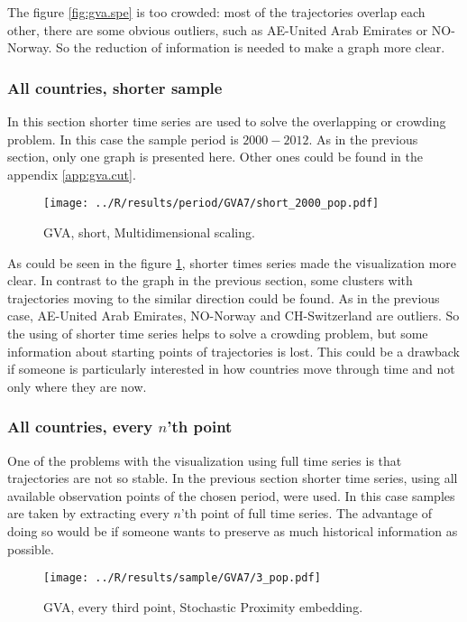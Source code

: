 \documentclass[a4paper]{article}
\begin{document}
The figure \ref{fig:gva.spe} is too crowded: most of the trajectories overlap each other, there are some obvious outliers, such as AE-United Arab Emirates or NO-Norway. So the reduction of information is needed to make a graph more clear.

\subsubsection{All countries, shorter sample}
In this section shorter time series are used to solve the overlapping or crowding problem. In this case the sample period is $2000-2012$. As in the previous section, only one graph is presented here. Other ones could be found in the appendix \ref{app:gva.cut}. 

\begin{figure}[!htbp]
\begin{center}
\texttt{[image: ../R/results/period/GVA7/short\_2000\_pop.pdf]}
\caption{GVA, short, Multidimensional scaling.}
\label{fig:gva.cut.mds}
\end{center}
\end{figure}

As could be seen in the figure \ref{fig:gva.cut.mds}, shorter times series made the visualization more clear. In contrast to the graph in the previous section, some clusters with trajectories moving to the similar direction could be found. As in the previous case, AE-United Arab Emirates, NO-Norway and CH-Switzerland are outliers. So the using of shorter time series helps to solve a crowding problem, but some information about starting points of trajectories is lost. This could be a drawback if someone is particularly interested in how countries move through time and not only where they are now. 

\subsubsection{All countries, every $n$'th point}
One of the problems with the visualization using full time series is that trajectories are not so stable. In the previous section shorter time series, using all available observation points of the chosen period, were used. In this case samples are taken by extracting every $n$'th point of full time series. The advantage of doing so would be if someone wants to preserve as much historical information as possible.

\begin{figure}[!htbp]
\begin{center}
\texttt{[image: ../R/results/sample/GVA7/3\_pop.pdf]}
\caption{GVA, every third point, Stochastic Proximity embedding.}
\label{fig:gva.sample.spe}
\end{center}
\end{figure}
\end{document}
